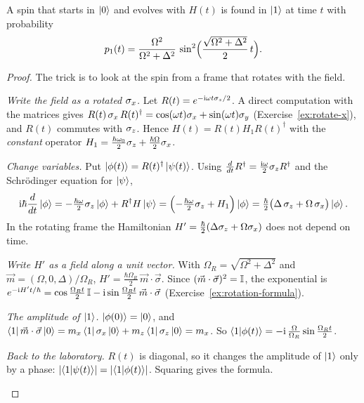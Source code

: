 \begin{theorem}\label{thm:rabi}
  A spin that starts in $\left|0\right\rangle$ and evolves with $H(t)$ is found in $\left|1\right\rangle$ at time $t$ with probability
  \[
    p_1(t)=\frac{\Omega^2}{\Omega^2+\Delta^2}\,\sin^2\Bigl(\frac{\sqrt{\Omega^2+\Delta^2}}{2}\,t\Bigr).
  \]
\end{theorem}
\begin{proof}
  The trick is to look at the spin from a frame that rotates with the field.
  \begin{steps}
    \item \emph{Write the field as a rotated $\sigma_x$.} Let $R(t)=e^{-\mathrm{i}\omega t\sigma_z/2}$. A direct computation with the matrices gives $R(t)\,\sigma_x\,R(t)^\dagger=\cos(\omega t)\sigma_x+\sin(\omega t)\sigma_y$ (Exercise~\ref{ex:rotate-x}), and $R(t)$ commutes with $\sigma_z$. Hence $H(t)=R(t)H_1R(t)^\dagger$ with the \emph{constant} operator $H_1=\tfrac{\hbar\omega_0}2\sigma_z+\tfrac{\hbar\Omega}2\sigma_x$.
    \item \emph{Change variables.} Put $\left|\phi(t)\right\rangle=R(t)^\dagger\left|\psi(t)\right\rangle$. Using $\frac{d}{dt}R^\dagger=\tfrac{\mathrm{i}\omega}2\sigma_z R^\dagger$ and the Schr\"odinger equation for $\left|\psi\right\rangle$,
      \[
        \mathrm{i}\hbar\frac{d}{dt}\left|\phi\right\rangle=-\tfrac{\hbar\omega}2\sigma_z\left|\phi\right\rangle+R^\dagger H\left|\psi\right\rangle=\Bigl(-\tfrac{\hbar\omega}2\sigma_z+H_1\Bigr)\left|\phi\right\rangle=\tfrac\hbar2\bigl(\Delta\,\sigma_z+\Omega\,\sigma_x\bigr)\left|\phi\right\rangle .
      \]
      In the rotating frame the Hamiltonian $H'=\tfrac\hbar2(\Delta\sigma_z+\Omega\sigma_x)$ does not depend on time.
    \item \emph{Write $H'$ as a field along a unit vector.} With $\Omega_R=\sqrt{\Omega^2+\Delta^2}$ and $\vec m=(\Omega,0,\Delta)/\Omega_R$, $H'=\tfrac{\hbar\Omega_R}2\,\vec m\cdot\vec\sigma$. Since $(\vec m\cdot\vec\sigma)^2=\mathbb{I}$, the exponential is $e^{-\mathrm{i} H't/\hbar}=\cos\tfrac{\Omega_Rt}2\,\mathbb{I}-\mathrm{i}\sin\tfrac{\Omega_Rt}2\,\vec m\cdot\vec\sigma$ (Exercise~\ref{ex:rotation-formula}).
    \item \emph{The amplitude of $\left|1\right\rangle$.} $\left|\phi(0)\right\rangle=\left|0\right\rangle$, and $\left\langle1\right|\vec m\cdot\vec\sigma\left|0\right\rangle=m_x\left\langle1\right|\sigma_x\left|0\right\rangle+m_z\left\langle1\right|\sigma_z\left|0\right\rangle=m_x$. So $\left\langle1\middle|\phi(t)\right\rangle=-\mathrm{i}\,\tfrac{\Omega}{\Omega_R}\sin\tfrac{\Omega_Rt}2$.
    \item \emph{Back to the laboratory.} $R(t)$ is diagonal, so it changes the amplitude of $\left|1\right\rangle$ only by a phase: $\left|\left\langle1\middle|\psi(t)\right\rangle\right|=\left|\left\langle1\middle|\phi(t)\right\rangle\right|$. Squaring gives the formula. \qedhere
  \end{steps}
\end{proof}

